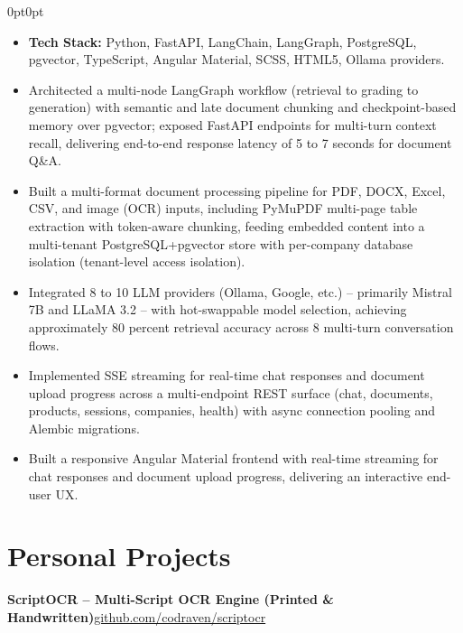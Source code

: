 \documentclass[10pt, letterpaper]{article}
\newenvironment{onecolentry}{
    \begin{adjustwidth}{0pt}{0pt}
}{
    \end{adjustwidth}
}
\newenvironment{highlights}{
    \begin{itemize}[topsep=2pt, parsep=0pt, partopsep=0pt, itemsep=2pt, leftmargin=0.8cm]
}{
    \end{itemize}
}
\newcommand{\headerrow}[2]{%
    \noindent\textbf{#1}\hfill #2\par%
}
\begin{document}
\vspace{-2pt}
\begin{onecolentry}
\begin{highlights}
    \item \textbf{Tech Stack:} Python, FastAPI, LangChain, LangGraph, PostgreSQL, pgvector, TypeScript, Angular Material, SCSS, HTML5, Ollama providers.
    \item Architected a multi-node LangGraph workflow (retrieval to grading to generation) with semantic and late document chunking and checkpoint-based memory over pgvector; exposed FastAPI endpoints for multi-turn context recall, delivering end-to-end response latency of 5 to 7 seconds for document Q\&A.
    \item Built a multi-format document processing pipeline for PDF, DOCX, Excel, CSV, and image (OCR) inputs, including PyMuPDF multi-page table extraction with token-aware chunking, feeding embedded content into a multi-tenant PostgreSQL+pgvector store with per-company database isolation (tenant-level access isolation).
    \item Integrated 8 to 10 LLM providers (Ollama, Google, etc.) -- primarily Mistral 7B and LLaMA 3.2 -- with hot-swappable model selection, achieving approximately 80 percent retrieval accuracy across 8 multi-turn conversation flows.
    \item Implemented SSE streaming for real-time chat responses and document upload progress across a multi-endpoint REST surface (chat, documents, products, sessions, companies, health) with async connection pooling and Alembic migrations.
    \item Built a responsive Angular Material frontend with real-time streaming for chat responses and document upload progress, delivering an interactive end-user UX.
\end{highlights}
\end{onecolentry}

\section{Personal Projects}

\headerrow{ScriptOCR -- Multi-Script OCR Engine (Printed \& Handwritten)}{\href{https://github.com/codraven/scriptocr}{github.com/codraven/scriptocr}}
\end{document}
